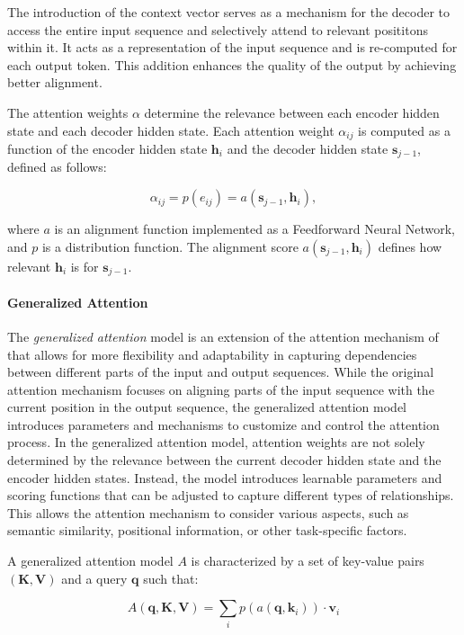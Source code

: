 \noindent The introduction of the context vector serves as a mechanism for the decoder to access the entire input sequence and selectively attend to relevant posititons within it. It acts as a representation of the input sequence and is re-computed for each output token. This addition enhances the quality of the output by achieving better alignment.

The attention weights $\alpha$ determine the relevance between each encoder hidden state and each decoder hidden state. Each attention weight $\alpha_{ij}$ is computed as a function of the encoder hidden state $\bm{h}_i$ and the decoder hidden state $\bm{s}_{j-1}$, defined as follows:

\begin{equation}
    \alpha_{ij} = p(e_{ij}) = a(\bm{s}_{j-1}, \bm{h}_i),
\end{equation}

\noindent where $a$ is an alignment function implemented as a Feedforward Neural Network, and $p$ is a distribution function. The alignment score $a(\bm{s}_{j-1}, \bm{h}_i)$ defines how relevant $\bm{h}_i$ is for $\bm{s}_{j-1}$.

\paragraph{Generalized Attention} The \textit{generalized attention} model \citep{chaudhari2021attentive} is an extension of the attention mechanism of \citet{bahdanau2014neural} that allows for more flexibility and adaptability in capturing dependencies between different parts of the input and output sequences. While the original attention mechanism focuses on aligning parts of the input sequence with the current position in the output sequence, the generalized attention model introduces parameters and mechanisms to customize and control the attention process. In the generalized attention model, attention weights are not solely determined by the relevance between the current decoder hidden state and the encoder hidden states. Instead, the model introduces learnable parameters and scoring functions that can be adjusted to capture different types of relationships. This allows the attention mechanism to consider various aspects, such as semantic similarity, positional information, or other task-specific factors.

A generalized attention model $A$ is characterized by a set of key-value pairs $(\bm{K}, \bm{V})$ and a query $\bm{q}$ such that:

\begin{equation}
    A(\bm{q}, \bm{K}, \bm{V}) = \sum_i p(a(\bm{q}, \bm{k}_i)) \cdot \bm{v}_i
\end{equation}

